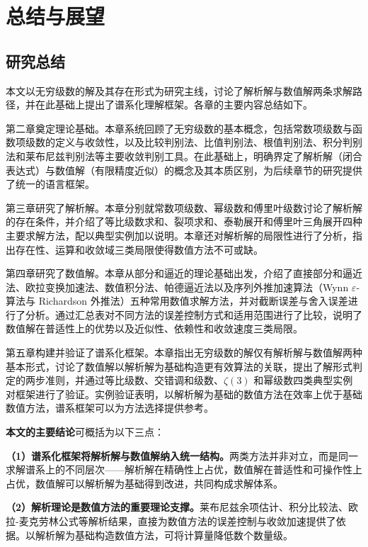 
\chapter{总结与展望}

\section{研究总结}

本文以无穷级数的解及其存在形式为研究主线，讨论了解析解与数值解两条求解路径，并在此基础上提出了谱系化理解框架。各章的主要内容总结如下。

第二章奠定理论基础。本章系统回顾了无穷级数的基本概念，包括常数项级数与函数项级数的定义与收敛性，以及比较判别法、比值判别法、根值判别法、积分判别法和莱布尼兹判别法等主要收敛判别工具。在此基础上，明确界定了解析解（闭合表达式）与数值解（有限精度近似）的概念及其本质区别，为后续章节的研究提供了统一的语言框架。

第三章研究了解析解。本章分别就常数项级数、幂级数和傅里叶级数讨论了解析解的存在条件，并介绍了等比级数求和、裂项求和、泰勒展开和傅里叶三角展开四种主要求解方法，配以典型实例加以说明。本章还对解析解的局限性进行了分析，指出存在性、运算和收敛域三类局限使得数值方法不可或缺。

第四章研究了数值解。本章从部分和逼近的理论基础出发，介绍了直接部分和逼近法、欧拉变换加速法、数值积分法、帕德逼近法以及序列外推加速算法（Wynn $\varepsilon$-算法与 Richardson 外推法）五种常用数值求解方法，并对截断误差与舍入误差进行了分析。通过汇总表对不同方法的误差控制方式和适用范围进行了比较，说明了数值解在普适性上的优势以及近似性、依赖性和收敛速度三类局限。

第五章构建并验证了谱系化框架。本章指出无穷级数的解仅有解析解与数值解两种基本形式，讨论了数值解以解析解为基础构造更有效算法的关联，提出了解形式判定的两步准则，并通过等比级数、交错调和级数、$\zeta(3)$ 和幂级数四类典型实例对框架进行了验证。实例验证表明，以解析解为基础的数值方法在效率上优于基础数值方法，谱系框架可以为方法选择提供参考。

\textbf{本文的主要结论}可概括为以下三点：

\textbf{（1）谱系化框架将解析解与数值解纳入统一结构。}两类方法并非对立，而是同一求解谱系上的不同层次——解析解在精确性上占优，数值解在普适性和可操作性上占优，数值解可以解析解为基础得到改进，共同构成求解体系。

\textbf{（2）解析理论是数值方法的重要理论支撑。}莱布尼兹余项估计、积分比较法、欧拉-麦克劳林公式等解析结果，直接为数值方法的误差控制与收敛加速提供了依据。以解析解为基础构造数值方法，可将计算量降低数个数量级。

